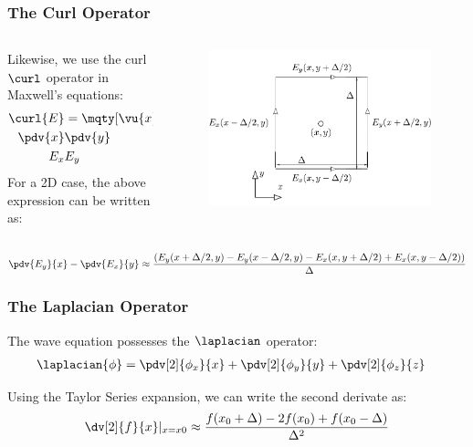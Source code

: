 \documentclass[10pt]{beamer}
\begin{document}
\begin{frame}
    \frametitle{The Curl Operator}

    \begin{columns}[T] %
        \begin{column}{.6\textwidth}
            Likewise, we use the curl $\curl$ operator in Maxwell's equations:
            \begin{align*}
                \curl{E} & = \mqty[\vu{x} & \vu{y} & \vu{z} \\ \pdv{x} & \pdv{y} & \pdv{z} \\ E_{x} & E_{y} & E_{z}]
            \end{align*}
            For a 2D case, the above expression can be written as:
        \end{column}
        \begin{column}{.4\textwidth}
            \begin{figure}[T!]
                \centering
                \includegraphics[width=.95\textwidth]{curl_E.pdf}
            \end{figure}
        \end{column}%
    \end{columns}
    \small
    \begin{align*}
        \pdv{E_y}{x} - \pdv{E_x}{y} \approx \frac{\left(E_{y}(x+\Delta/2, y) - E_{y} (x-\Delta/2, y) - E_{x} (x, y+\Delta/2) + E_{x}(x, y-{\Delta}/{2})\right)}{\Delta}
    \end{align*}
\end{frame}


\begin{frame}
    \frametitle{The Laplacian Operator}

    The wave equation possesses the $\laplacian$ operator:
    \begin{align*}
        \laplacian{\phi} & = \pdv[2]{\phi_x}{x} + \pdv[2]{\phi_y}{y} +  \pdv[2]{\phi_z}{z}
    \end{align*}

    Using the Taylor Series expansion, we can write the second derivate as:
    \begin{align*}
        \dv[2]{f}{x}|_{x = x0} \approx \frac{f(x_0 + \Delta) - 2f(x_0) + f(x_0 - \Delta)}{\Delta^2}
    \end{align*}



\end{frame}
\end{document}
